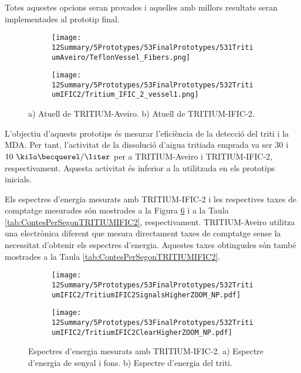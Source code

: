 Totes aquestes opcions seran provades i aquelles amb millors resultats seran implementades al prototip final.
\begin{figure}
\centering
    \begin{subfigure}[b]{0.5\textwidth}
    \centering
    \texttt{[image: 12Summary/5Prototypes/53FinalPrototypes/531TritiumAveiro/TeflonVessel\_Fibers.png]}  
        \caption{}\label{subfig:PrototipAveiro}
    \end{subfigure}
    \hfill
    \begin{subfigure}[b]{0.5\textwidth}
    \centering
    \texttt{[image: 12Summary/5Prototypes/53FinalPrototypes/532TritiumIFIC2/Tritium\_IFIC\_2\_vessel1.png]}  
    \caption{\label{subfig:PrototipIFIC2}}
    \end{subfigure}
\caption{a) Atuell de TRITIUM-Aveiro. b) Atuell de TRITIUM-IFIC-2. \label{fig:PrototipsAveiroIFIC2}}
\end{figure}
L'objectiu d'aquests prototips és mesurar l'eficiència de la detecció del triti i la MDA. Per tant, l'activitat de la dissolució d'aigua tritiada emprada va ser $30$ i $10~\kilo\becquerel/\liter$ per a TRITIUM-Aveiro i TRITIUM-IFIC-2, respectivament. Aquesta activitat és inferior a la utilitzada en els prototips inicials.

Els espectres d'energia mesurats amb TRITIUM-IFIC-2 i les respectives taxes de comptatge mesurades són  mostrades a la Figura \ref{fig:EspectresEnergeticsTRITIUMIFIC2} i a la Taula \ref{tab:ContesPerSegonTRITIUMIFIC2}, respectivament. TRITIUM-Aveiro utilitza una electrònica diferent que mesura directament taxes de comptatge sense la necessitat d'obtenir els espectres d'energia. Aquestes taxes obtingudes són també mostrades a la Taula \ref{tab:ContesPerSegonTRITIUMIFIC2}.

\begin{figure}
\centering
    \begin{subfigure}[b]{1\textwidth}
    \centering
    \texttt{[image: 12Summary/5Prototypes/53FinalPrototypes/532TritiumIFIC2/TritiumIFIC2SignalsHigherZOOM\_NP.pdf]}  
    \caption{\label{subfig:EspectreEnergeticSenyalFonsTritiumIFIC2}}
    \end{subfigure}
    \hfill
    \begin{subfigure}[b]{1\textwidth}
    \centering
    \texttt{[image: 12Summary/5Prototypes/53FinalPrototypes/532TritiumIFIC2/TritiumIFIC2ClearHigherZOOM\_NP.pdf]}  
    \caption{\label{subfig:EspectreEnergeticTritiTritiumIFIC2}}
    \end{subfigure}
 \caption{Espectres d'energia mesurats amb TRITIUM-IFIC-2. a) Espectre d'energia de senyal i fons. b) Espectre d'energia del triti.}
 \label{fig:EspectresEnergeticsTRITIUMIFIC2}
\end{figure}

